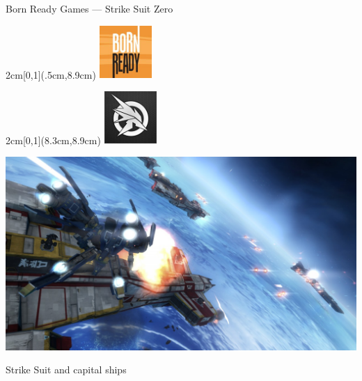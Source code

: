 \documentclass[t]{beamer}
\begin{document}
		\begin{frame}{Born Ready Games --- Strike Suit Zero}
			\begin{textblock*}{2cm}[0,1](.5cm,8.9cm) %
			\includegraphics[width=2cm]{bornready.jpg}
			\end{textblock*}
			\begin{textblock*}{2cm}[0,1](8.3cm,8.9cm) %
			\includegraphics[width=2cm]{strikesuitzero.jpg}
			\end{textblock*}
			\includegraphics[width=\linewidth]{capital.jpg}
			\begin{center}
				Strike Suit and capital ships
			\end{center}
		\end{frame}
\end{document}
